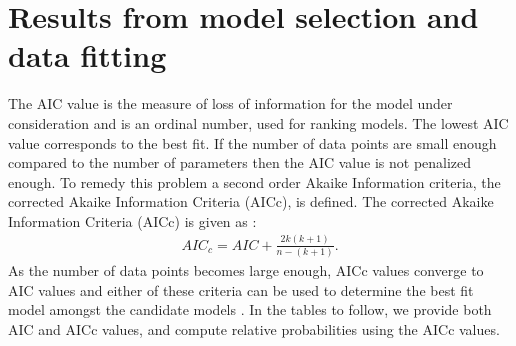 \section{Results from model selection and data fitting}\label{a2}
The AIC value is the measure of loss of information for the model under consideration and is an ordinal number, used for ranking models. The lowest AIC value corresponds to the best fit.  If the number of data points are small enough compared to the number of parameters then the AIC value is not penalized enough. To remedy this problem a second order Akaike Information criteria, the corrected Akaike Information Criteria (AICc), is defined. The corrected  Akaike Information Criteria (AICc) is given as \citep{burnham_model_2003}:
\begin{eqnarray}\label{aicc}
AIC_c=AIC + \frac{2k(k+1)}{n-(k+1)}.
\end{eqnarray}
As the number of data points becomes large enough, AICc values converge to AIC values and either of these criteria can be used to determine the best fit model amongst the candidate models \citep{burnham_model_2003}. In the tables to follow, we provide both AIC and AICc values, and compute relative probabilities using the AICc values.
